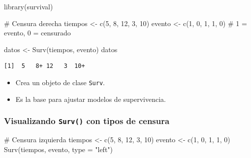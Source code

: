 \documentclass[
]{article}
\newenvironment{Shaded}{\begin{snugshade}}{\end{snugshade}}
\newcommand{\AttributeTok}[1]{\textcolor[rgb]{0.40,0.45,0.13}{#1}}
\newcommand{\CommentTok}[1]{\textcolor[rgb]{0.37,0.37,0.37}{#1}}
\newcommand{\DecValTok}[1]{\textcolor[rgb]{0.68,0.00,0.00}{#1}}
\newcommand{\FunctionTok}[1]{\textcolor[rgb]{0.28,0.35,0.67}{#1}}
\newcommand{\NormalTok}[1]{\textcolor[rgb]{0.00,0.23,0.31}{#1}}
\newcommand{\OtherTok}[1]{\textcolor[rgb]{0.00,0.23,0.31}{#1}}
\newcommand{\StringTok}[1]{\textcolor[rgb]{0.13,0.47,0.30}{#1}}
\providecommand{\tightlist}{%
  \setlength{\itemsep}{0pt}\setlength{\parskip}{0pt}}
\begin{document}
\begin{Shaded}
\begin{Highlighting}[]
\FunctionTok{library}\NormalTok{(survival)}

\CommentTok{\# Censura derecha}
\NormalTok{tiempos }\OtherTok{\textless{}{-}} \FunctionTok{c}\NormalTok{(}\DecValTok{5}\NormalTok{, }\DecValTok{8}\NormalTok{, }\DecValTok{12}\NormalTok{, }\DecValTok{3}\NormalTok{, }\DecValTok{10}\NormalTok{)}
\NormalTok{evento }\OtherTok{\textless{}{-}} \FunctionTok{c}\NormalTok{(}\DecValTok{1}\NormalTok{, }\DecValTok{0}\NormalTok{, }\DecValTok{1}\NormalTok{, }\DecValTok{1}\NormalTok{, }\DecValTok{0}\NormalTok{)  }\CommentTok{\# 1 = evento, 0 = censurado}

\NormalTok{datos }\OtherTok{\textless{}{-}} \FunctionTok{Surv}\NormalTok{(tiempos, evento)}
\NormalTok{datos}
\end{Highlighting}
\end{Shaded}

\begin{verbatim}
[1]  5   8+ 12   3  10+
\end{verbatim}

\begin{itemize}
\tightlist
\item
  Crea un objeto de clase \texttt{Surv}.
\item
  Es la base para ajustar modelos de supervivencia.
\end{itemize}

\subsubsection{\texorpdfstring{Visualizando \texttt{Surv()} con tipos de
censura}{Visualizando Surv() con tipos de censura}}\label{visualizando-surv-con-tipos-de-censura}

\begin{Shaded}
\begin{Highlighting}[]
\CommentTok{\# Censura izquierda}
\NormalTok{tiempos }\OtherTok{\textless{}{-}} \FunctionTok{c}\NormalTok{(}\DecValTok{5}\NormalTok{, }\DecValTok{8}\NormalTok{, }\DecValTok{12}\NormalTok{, }\DecValTok{3}\NormalTok{, }\DecValTok{10}\NormalTok{)}
\NormalTok{evento }\OtherTok{\textless{}{-}} \FunctionTok{c}\NormalTok{(}\DecValTok{1}\NormalTok{, }\DecValTok{0}\NormalTok{, }\DecValTok{1}\NormalTok{, }\DecValTok{1}\NormalTok{, }\DecValTok{0}\NormalTok{)}
\FunctionTok{Surv}\NormalTok{(tiempos, evento, }\AttributeTok{type =} \StringTok{"left"}\NormalTok{)}
\end{Highlighting}
\end{Shaded}
\end{document}
